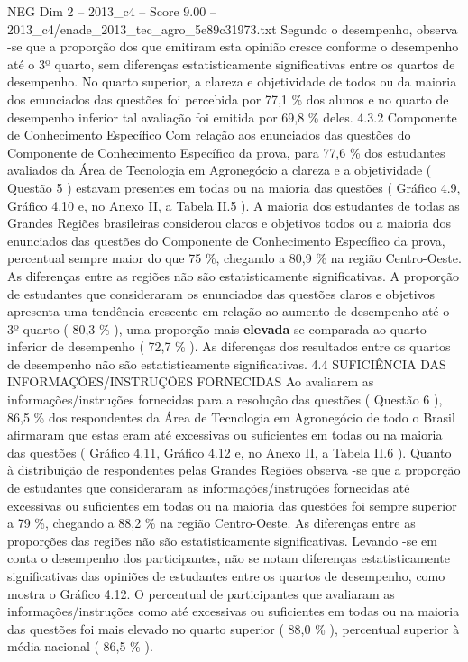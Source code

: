 \begin{textsample}{NEG Dim 2 – 2013\_c4 – Score 9.00 – 2013\_c4/enade\_2013\_tec\_agro\_5e89c31973.txt}
Segundo o desempenho, observa -se que a proporção dos que emitiram esta opinião cresce conforme o desempenho até o 3º quarto, sem diferenças estatisticamente significativas entre os quartos de desempenho.
No quarto superior, a clareza e objetividade de todos ou da maioria dos enunciados das questões foi percebida por 77,1 \% dos alunos e no quarto de desempenho inferior tal avaliação foi emitida por 69,8 \% deles. 4.3.2 Componente de Conhecimento Específico Com relação aos enunciados das questões do Componente de Conhecimento Específico da prova, para 77,6 \% dos estudantes avaliados da Área de Tecnologia em Agronegócio a clareza e a objetividade ( Questão 5 ) estavam presentes em todas ou na maioria das questões ( Gráfico 4.9, Gráfico 4.10 e, no Anexo II, a Tabela II.5 ).
A maioria dos estudantes de todas as Grandes Regiões brasileiras considerou claros e objetivos todos ou a maioria dos enunciados das questões do Componente de Conhecimento Específico da prova, percentual sempre maior do que 75 \%, chegando a 80,9 \% na região Centro-Oeste.
As diferenças entre as regiões não são estatisticamente significativas.
A proporção de estudantes que consideraram os enunciados das questões claros e objetivos apresenta uma tendência crescente em relação ao aumento de desempenho até o 3º quarto ( 80,3 \% ), uma proporção mais \textbf{elevada} se comparada ao quarto inferior de desempenho ( 72,7 \% ).
As diferenças dos resultados entre os quartos de desempenho não são estatisticamente significativas. 4.4 SUFICIÊNCIA DAS INFORMAÇÕES/INSTRUÇÕES FORNECIDAS Ao avaliarem as informações/instruções fornecidas para a resolução das questões ( Questão 6 ), 86,5 \% dos respondentes da Área de Tecnologia em Agronegócio de todo o Brasil afirmaram que estas eram até excessivas ou suficientes em todas ou na maioria das questões ( Gráfico 4.11, Gráfico 4.12 e, no Anexo II, a Tabela II.6 ).
Quanto à distribuição de respondentes pelas Grandes Regiões observa -se que a proporção de estudantes que consideraram as informações/instruções fornecidas até excessivas ou suficientes em todas ou na maioria das questões foi sempre superior a 79 \%, chegando a 88,2 \% na região Centro-Oeste.
As diferenças entre as proporções das regiões não são estatisticamente significativas.
Levando -se em conta o desempenho dos participantes, não se notam diferenças estatisticamente significativas das opiniões de estudantes entre os quartos de desempenho, como mostra o Gráfico 4.12.
O percentual de participantes que avaliaram as informações/instruções como até excessivas ou suficientes em todas ou na maioria das questões foi mais elevado no quarto superior ( 88,0 \% ), percentual superior à média nacional ( 86,5 \% ).

\end{textsample}
